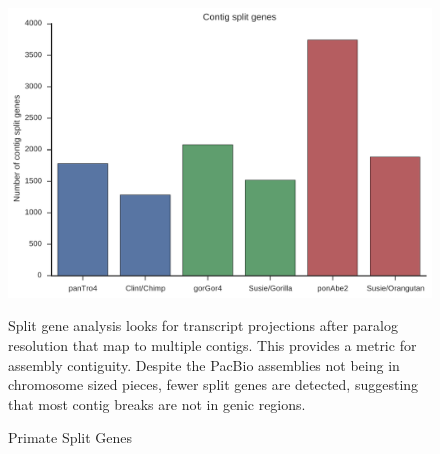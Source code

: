\documentclass[fleqn,10pt]{wlscirep}
\begin{document}
\begin{figure}
\centering
\includegraphics[width=\textwidth,height=\textheight,keepaspectratio]{split_genes.pdf}
\caption{Primate Split Genes}
\label{supp_fig:primate_split_genes}
Split gene analysis looks for transcript projections after paralog resolution that map to multiple contigs. This provides a metric for assembly contiguity. Despite the PacBio assemblies not being in chromosome sized pieces, fewer split genes are detected, suggesting that most contig breaks are not in genic regions.
\end{figure}
\end{document}
